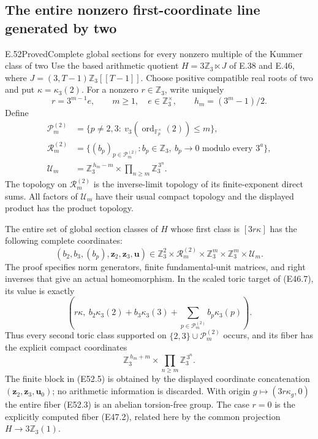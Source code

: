 \subsection{The entire nonzero first-coordinate line generated by two}

\begin{statement}{E.52}{Proved}{Complete global sections for every nonzero multiple of the Kummer class of two}
Use the based arithmetic quotient
$H=3\mathbb Z_3\ltimes J$ of E.38 and E.46, where
$J=(3,T-1)\mathbb Z_3[[T-1]]$.
Choose positive compatible real roots of two and put
$\kappa=\kappa_3(2)$.
For a nonzero $r\in\mathbb Z_3$, write uniquely
\[
 r=3^{m-1}e,\qquad m\ge1,\quad e\in\mathbb Z_3^\times,
 \qquad h_m=(3^m-1)/2 .
 \tag{E52.1}
\]
Define
\[
 \begin{split}
 \mathscr P_m^{(2)}
   &=\{p\ne2,3:\ v_3(\operatorname{ord}_{\mathbb F_p^\times}(2))
                                      \le m\},\\
 \mathcal R_m^{(2)}
   &=\{(b_p)_{p\in\mathscr P_m^{(2)}}:
      b_p\in\mathbb Z_3,\ 
      b_p\longrightarrow0\text{ modulo every }3^a\},\\
 \mathcal U_m
   &=\mathbb Z_3^{\,h_m-m}
                       \times\prod_{n\ge m}\mathbb Z_3^{\,3^n}.
 \end{split}
 \tag{E52.2}
\]
The topology on $\mathcal R_m^{(2)}$ is the
inverse-limit topology of its finite-exponent
direct sums. All factors of $\mathcal U_m$ have
their usual compact topology and the displayed
product has the product topology.

The entire set of global section classes of $H$
whose first class is $[3r\kappa]$ has the following
complete coordinates:
\[
 \boxed{\quad
 (b_2,b_3,(b_p),\boldsymbol z_2,\boldsymbol z_3,\boldsymbol u)
 \in
 \mathbb Z_3^2\times\mathcal R_m^{(2)}
                  \times\mathbb Z_3^m\times\mathbb Z_3^m
                  \times\mathcal U_m .
 \quad}
 \tag{E52.3}
\]
The proof specifies norm generators, finite
fundamental-unit matrices, and right inverses
that give an actual homeomorphism. In the scaled
toric target of (E46.7), its value is exactly
\[
 \left(r\kappa,\ 
    b_2\kappa_3(2)+b_3\kappa_3(3)
                   +\sum_{p\in\mathscr P_m^{(2)}}b_p\kappa_3(p)\right).
 \tag{E52.4}
\]
Thus every second toric class supported on
$\{2,3\}\cup\mathscr P_m^{(2)}$ occurs, and its
fiber has the explicit compact coordinates
\[
       \mathbb Z_3^{\,h_m+m}
                       \times\prod_{n\ge m}\mathbb Z_3^{\,3^n}.
 \tag{E52.5}
\]
The finite block in (E52.5) is obtained by the
displayed coordinate concatenation
$(\boldsymbol z_2,\boldsymbol z_3,\boldsymbol u_0)$;
no arithmetic information is discarded.
With origin $g\mapsto(3r\kappa_g,0)$ the entire
fiber (E52.3) is an abelian torsion-free group.
The case $r=0$ is the explicitly
computed fiber (E47.2), related here by the
common projection $H\to3\mathbb Z_3(1)$.


\end{statement}
